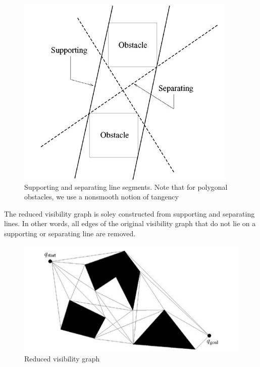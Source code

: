 \documentclass[11pt]{article}
\begin{document}
\begin{figure}[h]
	\centering
	\includegraphics{imgs/Supporting_separating_line_segments.png}
	\caption{Supporting and separating line segments. Note that for polygonal obstacles, we use a nonsmooth notion of tangency}
\end{figure}

The reduced visibility graph is soley constructed from supporting and separating lines. In other words, all edges of the original visibility graph that do not lie on a supporting or separating line are removed. \\

\begin{figure}[h]
	\centering
	\includegraphics{imgs/R_V_G.png}
	\caption{Reduced visibility graph}
\end{figure}
\end{document}
